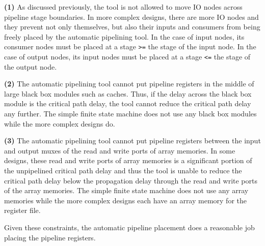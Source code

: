 {\bf (1)} 
As discussed previously, the tool is not allowed to move IO nodes across pipeline stage boundaries. In more complex designs, there are more IO nodes and they prevent not only themselves, but also their inputs and consumers from being freely placed by the automatic pipelining tool. In the case of input nodes, its consumer nodes must be placed at a stage {\tt >=} the stage of the input node. In the case of output nodes, its input nodes must be placed at a stage {\tt <=} the stage of the output node.

{\bf (2)}  
The automatic pipelining tool cannot put pipeline registers in the middle of large black box modules such as caches. Thus, if the delay across the black box module is the critical path delay, the tool cannot reduce the critical path delay any further. The simple finite state machine does not use any black box modules while the more complex designs do.

{\bf (3)} 
The automatic pipelining tool cannot put pipeline registers between the input and output muxes of the read and write ports of array memories. In some designs, these read and write ports of array memories is a significant portion of the unpipelined critical path delay and thus the tool is unable to reduce the critical path delay below the propagation delay through the read and write ports of the array memories. The simple finite state machine does not use any array memories while the more complex designs each have an array memory for the register file.

Given these constraints, the automatic pipeline placement does a reasonable job placing the pipeline registers.
